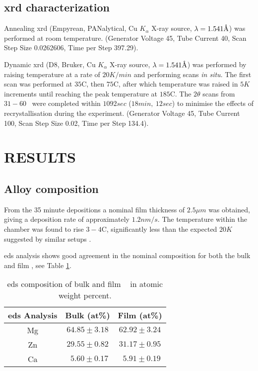 \documentclass[draft,a4paper,12pt,oneside]{article}%
\begin{document}
\subsection{\acrshort{xrd} characterization}
Annealing \acrshort{xrd} (Empyrean, PANalytical, Cu $K_{\alpha}$ X-ray source, $\lambda = 1.541 \mbox{\normalfont\AA}$) was performed at room temperature. 
(Generator Voltage 45, Tube Current 40, Scan Step Size 0.0262606, Time per Step 397.29). 

Dynamic \acrshort{xrd} (D8, Bruker, Cu $K_{\alpha}$ X-ray source, $\lambda = 1.541 \mbox{\normalfont\AA}$) was performed by raising temperature at a rate of $20 K/min$ and performing scans \textit{in situ}. The first scan was performed at $35$\degree C, then $75$\degree C, after which temperature was raised in $5K$ increments until reaching the peak temperature at $185$\degree C. The $2 \theta$ scans from $31 - 60$\degree~ were completed within $1092 sec$ ($18min,~ 12sec$) to minimise the effects of recrystallisation during the experiment. 
(Generator Voltage 45, Tube Current 100, Scan Step Size 0.02, Time per Step 134.4). 


\section{RESULTS}
\subsection{Alloy composition}

From the 35 minute depositions a nominal film thickness of $2.5 \mu m$ was obtained, giving a deposition rate of approximately $1.2 nm/s$. The temperature within the chamber was found to rise $3 - 4$\degree C, significantly less than the expected $20K$ suggested by similar setups \cite{Wang2014}.

\acrshort{eds} analysis shows good agreement in the nominal composition for both the bulk and film \MgZnCa, see Table \ref{tab:EDS_Composition}.

\begin{table}[h]
	\centering
	\begin{tabular}{ c c c }
		\toprule
		\acrshort{eds} Analysis & Bulk (at\%)  & Film (at\%)  \\
		\midrule
		Mg & $64.85 \pm 3.18$ & $62.92 \pm 3.24$ \\
		Zn & $29.55 \pm 0.82$ & $31.17 \pm 0.95$ \\
		Ca & $~~ 5.60 \pm 0.17$ & $~~ 5.91 \pm 0.19$ \\ 
		\bottomrule
	\end{tabular}
	\caption{\acrshort{eds} composition of bulk and film \MgZnCa~ in atomic weight percent.}
	\label{tab:EDS_Composition}
\end{table}
\end{document}
